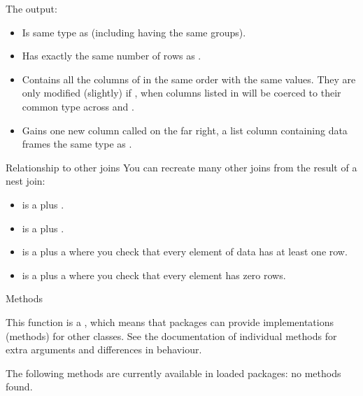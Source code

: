 \documentclass[a4paper]{book}
\begin{document}
%
\begin{Value}
The output:
\begin{itemize}

\item{} Is same type as  (including having the same groups).
\item{} Has exactly the same number of rows as .
\item{} Contains all the columns of  in the same order with the same values.
They are only modified (slightly) if , when columns listed
in  will be coerced to their common type across  and .
\item{} Gains one new column called  on the far right, a list column
containing data frames the same type as .

\end{itemize}

\end{Value}
%
\begin{Section}{Relationship to other joins}
You can recreate many other joins from the result of a nest join:
\begin{itemize}

\item{}  is a  plus .
\item{}  is a  plus .
\item{}  is a  plus a  where you check
that every element of data has at least one row.
\item{}  is a  plus a  where you check that every
element has zero rows.

\end{itemize}

\end{Section}
%
\begin{Section}{Methods}

This function is a , which means that packages can provide
implementations (methods) for other classes. See the documentation of
individual methods for extra arguments and differences in behaviour.

The following methods are currently available in loaded packages:
no methods found.
\end{Section}
\end{document}
